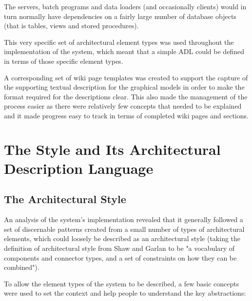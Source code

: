   The servers, batch programs and data loaders (and occasionally clients) would in turn normally have dependencies on a fairly large number of database objects (that is tables, views and stored procedures).

  This very specific set of architectural element types was used throughout the implementation of the system, which meant that a simple ADL could be defined in terms of those specific element types.

  A corresponding set of wiki page templates was created to support the capture of the supporting textual description for the graphical models in order to make the format required for the descriptions clear. This also made the management of the process easier as there were relatively few concepts that needed to be explained and it made progress easy to track in terms of completed wiki pages and sections.

\section{The Style and Its Architectural Description Language}

\subsection{The Architectural Style}

  An analysis of the system's implementation revealed that it generally followed a set of discernable patterns created from a small number of types of architectural elements, which could loosely be described as an architectural style (taking the definition of architectural style from Shaw and Garlan \cite{shaw1996-softwarearch} to be "a vocabulary of components and connector types, and a set of constraints on how they can be combined").  

  To allow the element types of the system to be described, a few basic concepts were used to set the context and help people to understand the key abstractions:

